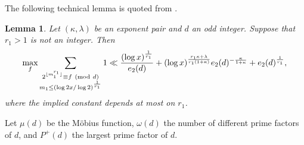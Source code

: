 \documentclass[12pt,a4paper,reqno]{amsart}
\numberwithin{equation}{section}
\def\pmod #1{\ ({\rm{mod}}\ #1)}
\theoremstyle{plain}
\newtheorem{lemma}{Lemma}
\theoremstyle{definition}
\begin{document}
The following technical lemma is quoted from \cite[inequality between (2.16) and (2.17), p. 171]{Ding-Zhai}.
\begin{lemma}\label{lem-3}
Let $(\kappa, \lambda)$ be an exponent pair and $d$ an odd integer.  Suppose that $r_1>1$ is not an integer. Then 
$$
\max_{f}\sum_{\substack{2^{ \lfloor m_1^{r_1}\rfloor}\equiv f\pmod{d}\\ m_1\le (\log 2x/\log 2)^{\frac{1}{r_1}}}}1\ll \frac{(\log x)^{\frac{1}{r_1}}}{e_2(d)}+(\log x)^{\frac{r_1\kappa+\lambda}{r_1(1+\kappa)}}e_2(d)^{-\frac{\kappa}{1+\kappa}}+e_2(d)^{\frac{1}{r_1}},
$$
where the implied constant depends at most on $r_1$.
\end{lemma}

Let $\mu(d)$ be the M\"obius function, $\omega(d)$ the number of different prime factors of $d$, and $P^+(d)$ the largest prime factor of $d$.
\end{document}
